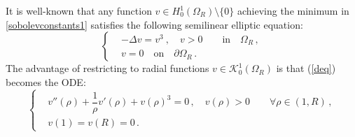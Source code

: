 \documentclass[a4paper,11pt]{article}
\numberwithin{equation}{section}
\numberwithin{figure}{section}
\def\eq#1{(\ref{#1})}
\begin{document}
It is well-known \cite[Chapter I]{struwe2008variational} that any function $v \in H_{0}^{1}(\Omega_{R}) \setminus \{0\}$ achieving the minimum in
\eqref{sobolevconstants1} satisfies the following semilinear elliptic equation:
\begin{equation}\label{deq}
	\left\{
	\begin{aligned}
		& -\Delta v = v^3\ ,\quad  v > 0 \qquad \text{in} \quad \Omega_{R} \, , \\[5pt]
		& v = 0 \quad \text{on} \quad \partial\Omega_{R} \, .
	\end{aligned}
	\right.
\end{equation}
The advantage of restricting to radial functions $v\in \mathcal{K}_{0}^{1}(\Omega_{R})$ is that \eq{deq} becomes the ODE:
\begin{equation}\label{deqradial}
	\left\{
	\begin{aligned}
		& v''(\rho) + \dfrac{1}{\rho} v'(\rho) + v(\rho)^{3} = 0\, ,\quad v(\rho) > 0 \qquad \forall \rho \in (1,R) \, ,\\[5pt]
		& v(1) = v(R) = 0 \, .
	\end{aligned}
	\right.
\end{equation}
\end{document}
